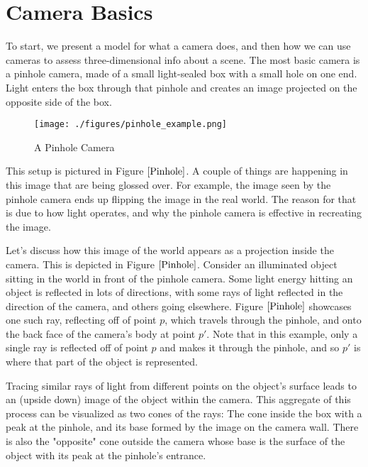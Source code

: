 \documentclass[
    12pt,
    twoside,
    bibstyle=chicago,
    headerstyle=uppercase,
	bibfile=biblatex_updating.bib
]{reedthesis}
\begin{document}

\section{Camera Basics}
To start, we present a model for what a camera does, and then how we can use cameras to assess three-dimensional info about a scene. The most basic camera is a pinhole camera, made of a small light-sealed box with a small hole on one end. Light enters the box through that pinhole and creates an image projected on the opposite side of the box.

\begin{figure}[h]
	    \centering
	    \texttt{[image: ./figures/pinhole\_example.png]}
	    \caption{A Pinhole Camera}
	\label{Pinhole}
	\end{figure}

This setup is pictured in Figure $\ref{Pinhole}$. A couple of things are happening in this image that are being glossed over. For example, the image seen by the pinhole camera ends up flipping the image in the real world. The reason for that is due to how light operates, and why the pinhole camera is effective in recreating the image.

Let's discuss how this image of the world appears as a projection inside the camera. This is depicted in Figure $\ref{Pinhole}$. Consider an illuminated object sitting in the world in front of the pinhole camera. Some light energy hitting an object is reflected in lots of directions, with some rays of light reflected in the direction of the camera, and others going elsewhere. Figure $\ref{Pinhole}$ showcases one such ray, reflecting off of point $p$, which travels through the pinhole, and onto the back face of the camera's body at point $p'$. Note that in this example, only a single ray is reflected off of point $p$ and makes it through the pinhole, and so $p'$ is where that part of the object is represented.

Tracing similar rays of light from different points on the object's surface leads to an (upside down) image of the object within the camera. This aggregate of this process can be visualized as two cones of the rays: The cone inside the box with a peak at the pinhole, and its base formed by the image on the camera wall. There is also the "opposite" cone outside the camera whose base is the surface of the object with its peak at the pinhole's entrance.
\end{document}
